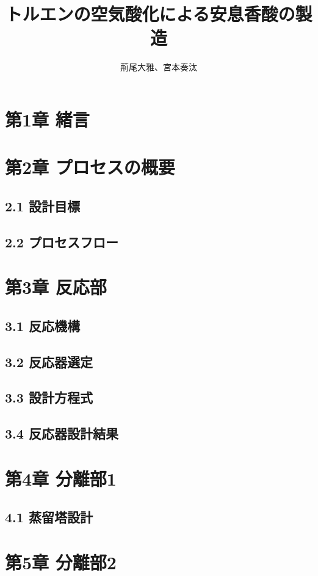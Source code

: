 \documentclass[a4j]{jsreport}
\begin{document}
\title{トルエンの空気酸化による安息香酸の製造}
\author{荊尾大雅、宮本奏汰}
\maketitle

\chapter*{第1章 緒言}

\chapter*{第2章 プロセスの概要}

\section*{2.1 設計目標}
\section*{2.2 プロセスフロー}


\chapter*{第3章 反応部}
\section*{3.1 反応機構}
\section*{3.2 反応器選定}
\section*{3.3 設計方程式}
\section*{3.4 反応器設計結果} 


\chapter*{第4章 分離部1}
\section*{4.1 蒸留塔設計}


\chapter*{第5章 分離部2}
\end{document}
